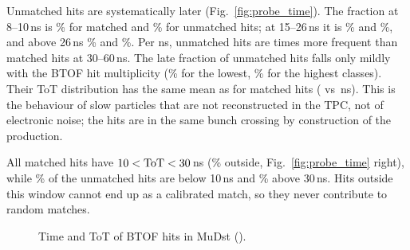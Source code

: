 Unmatched hits are systematically later (Fig.~\ref{fig:probe_time}). The fraction at 8--10\,ns is \prMpeak\% for matched
and \prUpeak\% for unmatched hits; at 15--26\,ns it is \prMmid\% and \prUmid\%, and above 26\,ns \prMlate\% and \prUlate\%.
Per ns, unmatched hits are \prRatioLate{} times more frequent than matched hits at 30--60\,ns. The late fraction of
unmatched hits falls only mildly with the BTOF hit multiplicity (\prLateLoMult\% for the lowest, \prLateHiMult\% for
the highest classes). Their ToT distribution has the same mean as for matched hits (\prTotU{} vs \prTotM\,ns). This is the
behaviour of slow particles that are not reconstructed in the TPC, not of electronic noise; the hits are in the same bunch
crossing by construction of the production.

All matched hits have $10<{\rm ToT}<30$\,ns (\prTotMout\% outside, Fig.~\ref{fig:probe_time} right), while \prTotUlow\% of
the unmatched hits are below 10\,ns and \prTotUhigh\% above 30\,ns. Hits outside this window cannot end up as a calibrated
match, so they never contribute to random matches.

\begin{figure}[H]
\centering
{}
\caption{Time and ToT of BTOF hits in MuDst ().}
\end{figure}


